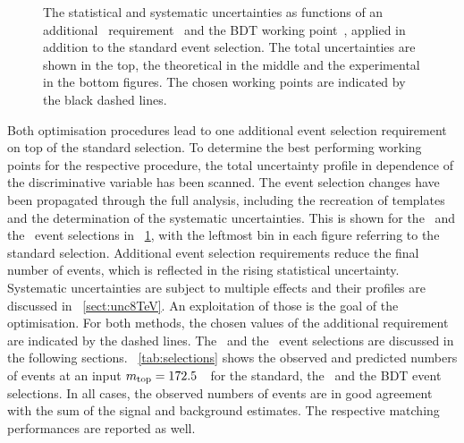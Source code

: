 \begin{figure}[tb!]
{  \label{sfig:BDT_optimisation}
}
\caption[Phase space optimisation for $\sqrts=8$~\TeV\ data]{
%
The statistical and systematic uncertainties as functions of an additional \ptlb\ requirement~ and the \gls{BDT} working point~, applied in addition to the standard event selection. The total uncertainties are shown in the top, the theoretical in the middle and the experimental in the bottom figures. The chosen working points are indicated by the black dashed lines.
%
\label{fig:llopti}
}
\end{figure}
%

Both optimisation procedures lead to one additional event selection requirement on top of the standard selection. To determine the best performing working points for the respective procedure, the total uncertainty profile in dependence of the discriminative variable has been scanned.
%
The event selection changes have been propagated through the full analysis, including the recreation of templates and the determination of the systematic uncertainties. This is shown for the \cutbased\ and the \mvabased\ event selections in \fig~\ref{fig:llopti}, with the leftmost bin in each figure referring to the standard selection. Additional event selection requirements reduce the final number of events, which is reflected in the rising statistical uncertainty. Systematic uncertainties are subject to multiple effects and their profiles are discussed in \sect~\ref{sect:unc8TeV}.
%
An exploitation of those is the goal of the optimisation. For both methods, the chosen values of the additional requirement are indicated by the dashed lines.
%
The \cutbased\ and the \mvabased\ event selections are discussed in the following sections.
%
\Tab~\ref{tab:selections} shows the observed and predicted numbers of events at an input $m_{\mathrm{top}}=172.5$~\GeV\ for the standard, the \cutbased\ and the \gls{BDT} event selections. In all cases, the observed numbers of events are in good agreement with the sum of the signal and background estimates.
% 
The respective matching performances are reported as well.
% 
